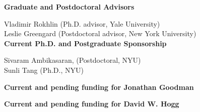 \documentclass[12pt]{article}
\begin{document}
\noindent
{\bf Graduate and Postdoctoral Advisors}\par \noindent
Vladimir Rokhlin (Ph.D. advisor, Yale University)\\
Leslie Greengard (Postdoctoral advisor, New York University)\\

\noindent
{\bf Current Ph.D. and Postgraduate Sponsorship} \par \noindent
Sivaram Ambikasaran, (Postdoctoral, NYU)\\
Sunli Tang (Ph.D., NYU)\\


\newpage
\begin{center}
    {\bf \large Current and pending funding for Jonathan Goodman}
\end{center}

\newpage
\begin{center}
    {\bf \large Current and pending funding for David W. Hogg}
\end{center}


\end{document}
